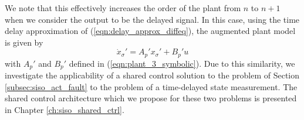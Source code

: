 We note that this effectively increases the order of the plant from $n$ to $n+1$ when we consider the output to be the delayed signal. In this case, using the time delay approximation of (\ref{eqn:delay_approx_diffeq}), the augmented plant model is given by
\begin{equation}
	\dot{x}_\sigma' = A_p' x_\sigma' + B_p' u \label{eqn:plant_3_tau}
\end{equation}
with $A_p'$ and $B_p'$ defined in (\ref{eqn:plant_3_symbolic}). Due to this similarity, we investigate the applicability of a shared control solution to the problem of Section \ref{subsec:siso_act_fault} to the problem of a time-delayed state measurement. The shared control architecture which we propose for these two problems is presented in Chapter \ref{ch:siso_shared_ctrl}.



